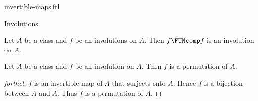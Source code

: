 \documentclass{stex}
\begin{document}
\begin{smodule}{invertible-maps.ftl}
\begin{sfragment}{Involutions}
  \begin{corollary}[forthel]
    Let $A$ be a class and $f$ be an involutions on $A$.
    Then $f \FUNcomp f$ is an involution on $A$.
  \end{corollary}

  \begin{proposition}[forthel]
    Let $A$ be a class and $f$ be an involution on $A$.
    Then $f$ is a permutation of $A$.
  \end{proposition}
  \begin{proof}[forthel]
    $f$ is an invertible map of $A$ that surjects onto $A$.
    Hence $f$ is a bijection between $A$ and $A$.
    Thus $f$ is a permutation of $A$.
  \end{proof}
\end{sfragment}
\end{smodule}
\end{document}
